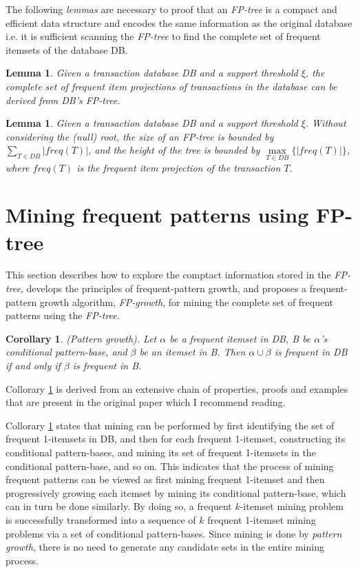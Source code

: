 \documentclass[12pt, a4paper]{article}
\newtheorem{corollary}{Corollary}[theorem]
\newtheorem{lemma}[theorem]{Lemma}
\begin{document}
The following \textit{lemmas} are necessary to proof that an \textit{FP-tree} is a compact and efficient data structure and encodes the same information as the original database i.e. it is sufficient scanning the \textit{FP-tree} to find the complete set of frequent itemsets of the database DB.

\begin{lemma}
  Given a transaction database DB and a support threshold $\xi$, the complete set of frequent item projections of transactions in the database can be derived from DB's FP-tree.
\end{lemma}

\begin{lemma}
  Given a transaction database DB and a support threshold $\xi$. Without considering the (null) root, the size of an FP-tree is bounded by $\sum_{T \in DB} |freq(T)|$, and the height of the tree is bounded by $\underset{T \in DB}{\max} \{|freq(T)|\}$, where $freq(T)$ is the frequent item projection of the transaction $T$.
\end{lemma}

\section{Mining frequent patterns using FP-tree}

This section describes how to explore the comptact information stored in the \textit{FP-tree}, develops the principles of frequent-pattern growth, and proposes a frequent-pattern growth algorithm, \textit{FP-growth}, for mining the complete set of frequent patterns using the \textit{FP-tree}.

\begin{corollary}\label{cor:pattern-growth}
  (Pattern growth). \quad Let $\alpha$ be a frequent itemset in DB, B be $\alpha$'s conditional pattern-base, and $\beta$ be an itemset in B. Then $\alpha \cup \beta$ is frequent in DB if and only if $\beta$ is frequent in B.
\end{corollary}

Collorary \ref{cor:pattern-growth} is derived from an extensive chain of properties, proofs and examples that are present in the original paper which I recommend reading.

Collorary \ref{cor:pattern-growth} states that mining can be performed by first identifying the set of frequent 1-itemsets in DB, and then for each frequent 1-itemset, constructing its conditional pattern-bases, and mining its set of frequent 1-itemsets in the conditional pattern-base, and so on. This indicates that the process of mining frequent patterns can be viewed as first mining frequent 1-itemset and then progressively growing each itemset by mining its conditional pattern-base, which can in turn be done similarly. By doing so, a frequent $k$-itemset mining problem is successfully transformed into a sequence of $k$ frequent 1-itemset mining problems via a set of conditional pattern-bases. Since mining is done by \textit{pattern growth}, there is no need to generate any candidate sets in the entire mining process.
\end{document}
